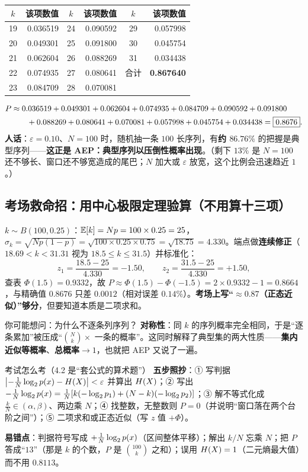 \documentclass[11pt,a4paper]{ctexart}
\begin{document}
\begin{center}
\small
\begin{tabular}{@{}c r@{\qquad}c r@{\qquad}c r@{}}
\toprule
$k$ & 该项数值 & $k$ & 该项数值 & $k$ & 该项数值\\
\midrule
19 & 0.036519 & 24 & 0.090592 & 29 & 0.057998\\
20 & 0.049301 & 25 & 0.091800 & 30 & 0.045754\\
21 & 0.062604 & 26 & 0.088269 & 31 & 0.034438\\
22 & 0.074935 & 27 & 0.080641 & 合计 & \textbf{0.867640}\\
23 & 0.084709 & 28 & 0.070081 & & \\
\bottomrule
\end{tabular}
\end{center}
\begin{align*}
P&\approx0.036519+0.049301+0.062604+0.074935+0.084709+0.090592+0.091800\notag\\
&\qquad+0.088269+0.080641+0.070081+0.057998+0.045754+0.034438
=\boxed{0.8676}.
\end{align*}
\textbf{人话}：$\varepsilon=0.10$、$N=100$ 时，随机抽一条 $100$ 长序列，有\textbf{约 $86.76\%$} 的把握是典型序列——\textbf{这正是 AEP：典型序列以压倒性概率出现}。（剩下 $13\%$ 是 $N=100$ 还不够长、窗口还不够宽造成的尾巴；$N$ 加大或 $\varepsilon$ 放宽，这个比例会迅速趋近 $1$。）

\subsection{考场救命招：用中心极限定理验算（不用算十三项）}
$k\sim B(100,0.25)$：$\operatorname{\mathbb{E}}[k]=Np=100\times0.25=25$，$\sigma_k=\sqrt{Np(1-p)}=\sqrt{100\times0.25\times0.75}=\sqrt{18.75}=4.330$。端点做\textbf{连续修正}（$18.69<k<31.31$ 视为 $18.5\le k\le31.5$）并标准化：
\[
z_1=\frac{18.5-25}{4.330}=-1.50,\qquad z_2=\frac{31.5-25}{4.330}=+1.50,
\]
查表 $\Phi(1.5)=0.9332$，故 $P\approx\Phi(1.5)-\Phi(-1.5)=2\times0.9332-1=0.8664$，与精确值 $0.8676$ 只差 $0.0012$（相对误差 $0.14\%$）。\textbf{考场上写“$\approx0.87$（正态近似）”够分}，但要知道本质是二项求和。

\begin{qa}{你可能想问：为什么不逐条列序列？}
\textbf{对称性}：同 $k$ 的序列概率完全相同，于是“逐条累加”被压成“$\binom Nk\times$ 一条的概率”。这同时解释了典型集的两大性质——\textbf{集内近似等概率}、\textbf{总概率$\to1$}，也就把 AEP 又说了一遍。
\end{qa}

\begin{exam}{考试怎么考（4.2 是“套公式的算术题”）}
\textbf{五步照抄}：① 写判据 $\bigl|-\frac1N\log_{2}p\!\left(x\right)-H\!\left(X\right)\bigr|<\varepsilon$ 并算出 $H\!\left(X\right)$；② 写出 $-\frac1N\log_{2}p\!\left(x\right)=\frac1N[k(-\log_{2} p_1)+(N-k)(-\log_{2} p_2)]$；③ 解不等式化成 $\frac kN\in(\alpha,\beta)$、两边乘 $N$；④ 找整数，无整数则 $P=0$（并说明“窗口落在两个台阶之间”）；⑤ 二项求和或正态近似（写 $z$ 值 $+\Phi$）。

\textbf{易错点}：判据符号写成 $+\frac1N\log_{2}p\!\left(x\right)$（区间整体平移）；解出 $k/N$ 忘乘 $N$；把 $P$ 答成“$13$”（那是 $k$ 的个数，$P$ 是 $\binom{100}{k}$ 之和）；误用 $H\!\left(X\right)=1$（二元熵最大值）而不用 $0.8113$。
\end{exam}
\end{document}
